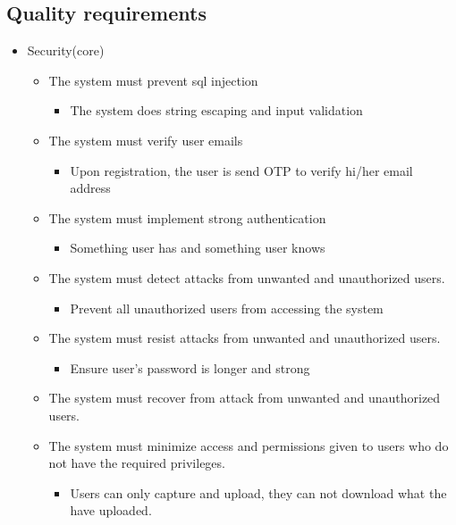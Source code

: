\documentclass[a4paper,12pt]{article}
\begin{document}
\subsection{Quality requirements}
	\begin{itemize}
	\item Security(core)
	\begin{itemize}
		\item The system must prevent sql injection
			\begin{itemize}
				\item The system does string escaping and input validation
			\end{itemize}
		\item The system must verify user emails
			\begin{itemize}
				\item Upon registration, the user is send OTP to verify hi/her email address
			\end{itemize}
		\item The system must implement strong authentication
			\begin{itemize}
				\item Something user has and something user knows
			\end{itemize}
		\item The system must detect attacks from unwanted and unauthorized users.
			\begin{itemize}
				\item Prevent all unauthorized users from accessing the system 
			\end{itemize}
		\item The system must resist attacks from unwanted and unauthorized users.
			\begin{itemize}
				\item Ensure user's password is longer and strong
			\end{itemize}
		\item The system must recover from attack from unwanted and unauthorized users.
		
		\item The system must minimize access and permissions given to users who do not have the
			required privileges.
				\begin{itemize}
				\item Users can only capture and upload, they can not download what the have uploaded.
	 

\end{itemize}
\end{itemize}
\end{itemize}
\end{document}
